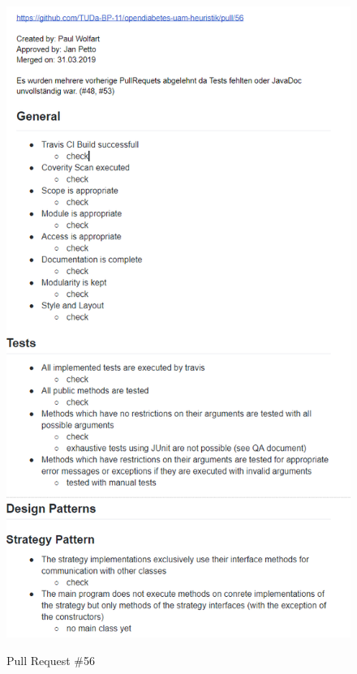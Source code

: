 \documentclass[accentcolor=tud0b,12pt,paper=a4]{tudreport}
\begin{document}
\begin{figure}[h]
\centering
\caption{Pull Request \#56}
\includegraphics[width=\textwidth,height=\textheight,keepaspectratio]{pr-56}
\label{pr:56}
\end{figure}
\end{document}
